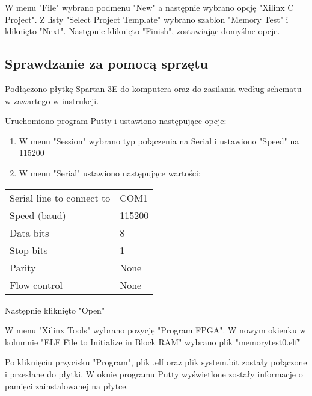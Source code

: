 W menu "File" wybrano podmenu "New" a następnie wybrano opcję "Xilinx C Project". Z listy
"Select Project Template" wybrano szablon "Memory Test" i kliknięto "Next". Następnie kliknięto
"Finish", zostawiając domyślne opcje.

\subsection{Sprawdzanie za pomocą sprzętu}

Podłączono płytkę Spartan-3E do komputera oraz do zasilania według schematu w
zawartego w instrukcji.

Uruchomiono program Putty i ustawiono następujące opcje:
\begin{enumerate}
	\item W menu "Session" wybrano typ połączenia na Serial i ustawiono "Speed" na 115200
	\item W menu "Serial" ustawiono następujące wartości:
\end{enumerate}

\begin{center}
\begin{tabular}{|l|l|}
	Serial line to connect to & COM1\\
	Speed (baud) & 115200\\
	Data bits & 8\\
	Stop bits & 1 \\
	Parity & None\\
	Flow control & None
\end{tabular}
\end{center}

Następnie kliknięto "Open"

W menu "Xilinx Tools" wybrano pozycję "Program FPGA". W nowym okienku w kolumnie "ELF File to
Initialize in Block RAM" wybrano plik "memory\textunderscore test\textunderscore 0.elf"

Po kliknięciu przycisku "Program", plik .elf oraz plik system.bit zostały połączone i przesłane
do płytki. W oknie programu Putty wyświetlone zostały informacje o pamięci zainstalowanej na
płytce.
